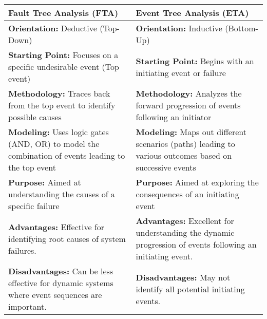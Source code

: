 \noindent\begin{tabularx}{\textwidth}{X X}
\toprule
\textbf{Fault Tree Analysis (FTA)} & \textbf{Event Tree Analysis (ETA)} \\
\midrule
\textbf{Orientation:} Deductive (Top-Down) & \textbf{Orientation:} Inductive (Bottom-Up) \\
\textbf{Starting Point:} Focuses on a specific undesirable event (Top event) & \textbf{Starting Point:} Begins with an initiating event or failure \\
\textbf{Methodology:} Traces back from the top event to identify possible causes & \textbf{Methodology:} Analyzes the forward progression of events following an initiator \\
\textbf{Modeling:} Uses logic gates (AND, OR) to model the combination of events leading to the top event & \textbf{Modeling:} Maps out different scenarios (paths) leading to various outcomes based on successive events \\
\textbf{Purpose:} Aimed at understanding the causes of a specific failure & \textbf{Purpose:} Aimed at exploring the consequences of an initiating event \\
\textbf{Advantages:} Effective for identifying root causes of system failures. & \textbf{Advantages:} Excellent for understanding the dynamic progression of events following an initiating event. \\
\textbf{Disadvantages:} Can be less effective for dynamic systems where event sequences are important. & \textbf{Disadvantages:} May not identify all potential initiating events. \\
\end{tabularx}

\noindent %
\begin{minipage}[t]{0.48\textwidth}
\centering
{}
\end{minipage}%
\hfill %
\begin{minipage}[t]{0.48\textwidth}
\centering
{}
\end{minipage}
\newline
\bottomrule

